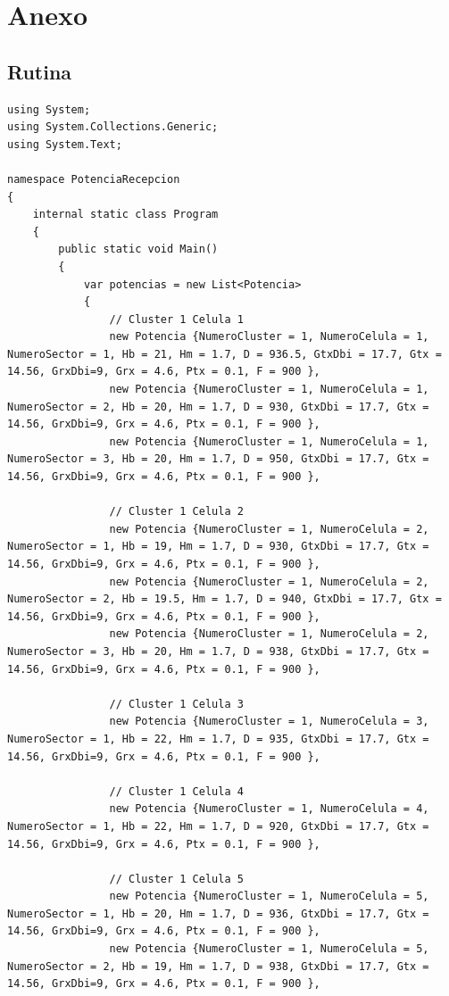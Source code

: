 \documentclass[11pt,letterpaper]{article}
\begin{document}
\section{Anexo}
\subsection{Rutina}
\begin{lstlisting}[style=CStyle]
using System;
using System.Collections.Generic;
using System.Text;

namespace PotenciaRecepcion
{
    internal static class Program
    {
        public static void Main()
        {
            var potencias = new List<Potencia>
            {
                // Cluster 1 Celula 1
                new Potencia {NumeroCluster = 1, NumeroCelula = 1, NumeroSector = 1, Hb = 21, Hm = 1.7, D = 936.5, GtxDbi = 17.7, Gtx = 14.56, GrxDbi=9, Grx = 4.6, Ptx = 0.1, F = 900 },
                new Potencia {NumeroCluster = 1, NumeroCelula = 1, NumeroSector = 2, Hb = 20, Hm = 1.7, D = 930, GtxDbi = 17.7, Gtx = 14.56, GrxDbi=9, Grx = 4.6, Ptx = 0.1, F = 900 },
                new Potencia {NumeroCluster = 1, NumeroCelula = 1, NumeroSector = 3, Hb = 20, Hm = 1.7, D = 950, GtxDbi = 17.7, Gtx = 14.56, GrxDbi=9, Grx = 4.6, Ptx = 0.1, F = 900 },

                // Cluster 1 Celula 2
                new Potencia {NumeroCluster = 1, NumeroCelula = 2, NumeroSector = 1, Hb = 19, Hm = 1.7, D = 930, GtxDbi = 17.7, Gtx = 14.56, GrxDbi=9, Grx = 4.6, Ptx = 0.1, F = 900 },
                new Potencia {NumeroCluster = 1, NumeroCelula = 2, NumeroSector = 2, Hb = 19.5, Hm = 1.7, D = 940, GtxDbi = 17.7, Gtx = 14.56, GrxDbi=9, Grx = 4.6, Ptx = 0.1, F = 900 },
                new Potencia {NumeroCluster = 1, NumeroCelula = 2, NumeroSector = 3, Hb = 20, Hm = 1.7, D = 938, GtxDbi = 17.7, Gtx = 14.56, GrxDbi=9, Grx = 4.6, Ptx = 0.1, F = 900 },

                // Cluster 1 Celula 3
                new Potencia {NumeroCluster = 1, NumeroCelula = 3, NumeroSector = 1, Hb = 22, Hm = 1.7, D = 935, GtxDbi = 17.7, Gtx = 14.56, GrxDbi=9, Grx = 4.6, Ptx = 0.1, F = 900 },

                // Cluster 1 Celula 4
                new Potencia {NumeroCluster = 1, NumeroCelula = 4, NumeroSector = 1, Hb = 22, Hm = 1.7, D = 920, GtxDbi = 17.7, Gtx = 14.56, GrxDbi=9, Grx = 4.6, Ptx = 0.1, F = 900 },

                // Cluster 1 Celula 5
                new Potencia {NumeroCluster = 1, NumeroCelula = 5, NumeroSector = 1, Hb = 20, Hm = 1.7, D = 936, GtxDbi = 17.7, Gtx = 14.56, GrxDbi=9, Grx = 4.6, Ptx = 0.1, F = 900 },
                new Potencia {NumeroCluster = 1, NumeroCelula = 5, NumeroSector = 2, Hb = 19, Hm = 1.7, D = 938, GtxDbi = 17.7, Gtx = 14.56, GrxDbi=9, Grx = 4.6, Ptx = 0.1, F = 900 },


\end{lstlisting}
\end{document}
